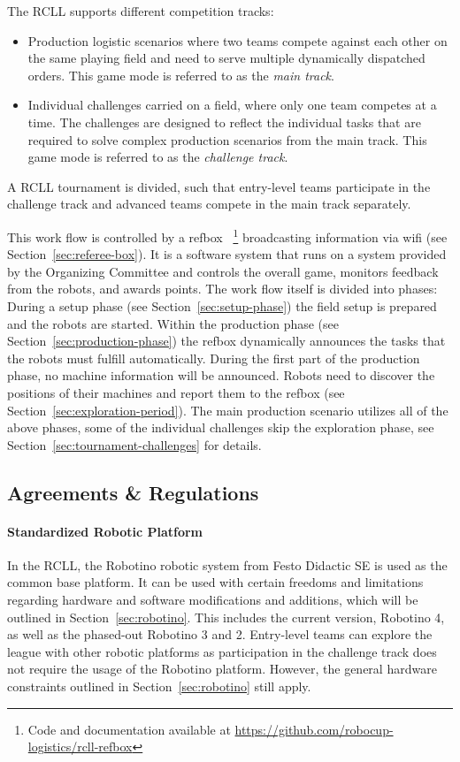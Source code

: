 \documentclass[12pt,twoside]{article}
\newcommand{\refsec}[1]{Section~\ref{#1}}
\begin{document}
The RCLL supports different competition tracks:
\begin{itemize}\itemsep0em
  \item Production logistic scenarios where two teams compete against
    each other on the same playing field and need to serve multiple dynamically
    dispatched orders. This game mode is referred to as the \emph{main track}.
  \item Individual challenges carried on a field, where only one team competes
   at a time.
   The challenges are designed to reflect the individual tasks that
   are required to solve complex production scenarios from the main track.
   This game mode is referred to as the \emph{challenge track}.
\end{itemize}
A \ac{RCLL} tournament is divided, such that entry-level teams participate in
the challenge track and advanced teams compete in the main track separately.

This work flow is controlled by a \acf{refbox}~\cite{RCI-RefBox}%
\footnote{Code and documentation available at
\url{https://github.com/robocup-logistics/rcll-refbox}}
broadcasting information via wifi (see \refsec{sec:referee-box}).
It is a software system that runs on a
system provided by the Organizing Committee and controls the overall game,
monitors feedback from the robots, and awards points.
The work flow itself is divided into phases:
During a setup phase (see \refsec{sec:setup-phase})
the field setup is prepared and the robots are started.
Within the production phase (see \refsec{sec:production-phase}) the
\ac{refbox} dynamically announces the tasks that the robots must fulfill
automatically. During the first part of the production phase, no machine
information will be announced.
Robots need to discover the positions of their machines and report
them to the \ac{refbox} (see \refsec{sec:exploration-period}).
The main production scenario utilizes all of the above phases, some of the
individual challenges skip the exploration phase, see
\refsec{sec:tournament-challenges} for details.

\subsection{Agreements \& Regulations}
\label{sec:agreements}
\paragraph{Standardized Robotic Platform}
In the \ac{RCLL}, the Robotino robotic system from Festo Didactic SE is used as
the common base platform.
It can be used with certain freedoms and limitations regarding hardware and
software modifications and additions, which will be outlined in
\refsec{sec:robotino}.
This includes the current version, Robotino 4, as well as the phased-out
Robotino 3 and 2.
Entry-level teams can explore the league with other robotic platforms as
participation in the challenge track does not require the usage of the
Robotino platform. However, the general hardware constraints outlined in
\refsec{sec:robotino} still apply.
\end{document}
